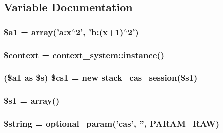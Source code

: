 \subsection{Variable Documentation}
\hypertarget{caschat_8php_abea4e8ac5e11c696186068d74fdc6035}{
\subsubsection[{\$a1}]{\setlength{\rightskip}{0pt plus 5cm}\$a1 = array('a:x$^\wedge$2', 'b:(x+1)$^\wedge$2')}}
\label{caschat_8php_abea4e8ac5e11c696186068d74fdc6035}
\hypertarget{caschat_8php_ae05dedb802ada0155efdece2044fed64}{
\subsubsection[{\$context}]{\setlength{\rightskip}{0pt plus 5cm}\$context = context\_\-system::instance()}}
\label{caschat_8php_ae05dedb802ada0155efdece2044fed64}
\hypertarget{caschat_8php_ac854c221a8efd104a22cb158254655d0}{
\subsubsection[{\$cs1}]{ (\$a1 as \$s) \$cs1 = new stack\_\-cas\_\-session(\$s1)}}
\label{caschat_8php_ac854c221a8efd104a22cb158254655d0}
\hypertarget{caschat_8php_acd919763fb6f6681741261ca81ac2a55}{
\subsubsection[{\$s1}]{\setlength{\rightskip}{0pt plus 5cm}\$s1 = array()}}
\label{caschat_8php_acd919763fb6f6681741261ca81ac2a55}
\hypertarget{caschat_8php_a05bc82187ba145848edd864852f4bd37}{
\subsubsection[{\$string}]{\setlength{\rightskip}{0pt plus 5cm}\$string = optional\_\-param('cas', '', PARAM\_\-RAW)}}
\label{caschat_8php_a05bc82187ba145848edd864852f4bd37}
